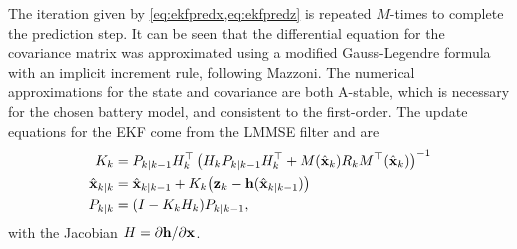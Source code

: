 \documentclass[../zhang_thesis.tex]{subfiles}
\begin{document}
The iteration given by \cref{eq:ekfpredx,eq:ekfpredz} is repeated $M$-times to complete the prediction step.  It can be seen that the differential equation for the covariance matrix was approximated using a modified Gauss-Legendre formula with an implicit increment rule, following Mazzoni. The numerical approximations for the state and covariance are both A-stable, which is necessary for the chosen battery model, and consistent to the first-order. 
The update equations for the EKF come from the LMMSE filter and are
\begin{align}
    K_k &= P_{k|k-1} H_k^\top \left( H_k P_{k|k-1} H_k^\top + M(\hat{\mathbf{x}}_k) R_k M^\top(\hat{\mathbf{x}}_k) \right)^{-1} \\
    \hat{\mathbf{x}}_{k|k} &= \hat{\mathbf{x}}_{k|k-1} + K_k \big( \mathbf{z}_k - \mathbf{h}(\hat{\mathbf{x}}_{k|k-1}) \big) \\
    P_{k|k} &= (I - K_k H_k) P_{k|k-1}, \label{eq:ekf_l}
\end{align}
with the Jacobian $H=\partial\mathbf{h}/\partial\mathbf{x}$.
\end{document}
